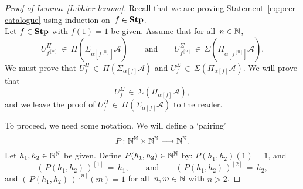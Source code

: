 \begin{proof}[Proof of Lemma~\ref{L:bhier-lemma}]
\vspace{.6em}
\noindent
Recall that we are proving Statement~\eqref{eq:peer-catalogue}
using induction on~$f\in\mathbf{Stp}$.\\
Let $f\in\mathbf{Stp}$
with $f(1)=1$ be given.
Assume that for all~$n\in\mathbb{N}$,
\begin{equation*}
U^\Pi_{f^{[n]}} \,\in\, \Pi(\Sigma_{\alpha[f^{[n]}]}\mathcal{A})
\qquad\text{and}\qquad
U^\Sigma_{f^{[n]}} \,\in\, \Sigma(\Pi_{\alpha[f^{[n]}]}\mathcal{A}).
\end{equation*}
We must prove that 
$U^\Pi_f \,\in\, \Pi(\Sigma_{\alpha[f]} \mathcal{A})$
and $U^\Sigma_f \,\in\, \Sigma(\Pi_{\alpha[f]} \mathcal{A})$.
We will prove that
\begin{equation}
\label{eq:peer-catalogue-induction}
U^\Sigma_f \,\in\, \Sigma(\Pi_{\alpha[f]} \mathcal{A}),
\end{equation}
and we leave the proof of
$U^\Pi_f \,\in\, \Pi(\Sigma_{\alpha[f]} \mathcal{A})$
to the reader.

To proceed, we need some notation.
We will define a `pairing'
\begin{equation*}
P\colon \mathbb{N}^{\mathbb{N}} \times \mathbb{N}^{\mathbb{N}}\longrightarrow \mathbb{N}^{\mathbb{N}}.
\end{equation*}
Let $h_1,h_2\in\mathbb{N}^{\mathbb{N}}$ be given.
Define $P(h_1,h_2)\in\mathbb{N}^{\mathbb{N}}$
by: $P(h_1,h_2)(1) = 1$, and
\begin{equation*}
(\,P(h_1,h_2)\,)^{[1]} \,=\, h_1,
\qquad\text{and}\qquad
(\,P(h_1,h_2)\,)^{[2]} \,=\, h_2,
\end{equation*}
and $(\,P(h_1,h_2)\,)^{[n]}(m) = 1$
for all~$n,m\in\mathbb{N}$ with $n>2$.


\end{proof}
